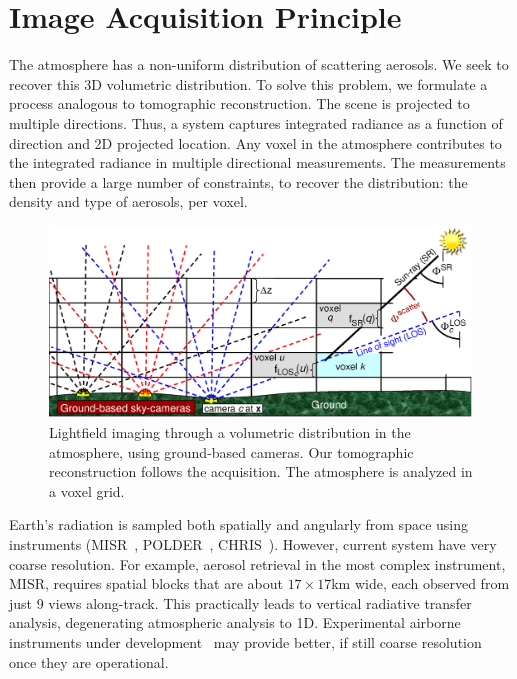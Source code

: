 \documentclass[10pt,twocolumn,letterpaper]{article}
\begin{document}
\section{Image Acquisition Principle}
\label{sec:setup} \vspace{-0.2cm}

The atmosphere has a non-uniform distribution of scattering aerosols. We seek to recover this 3D volumetric distribution. To solve this problem, we formulate a process analogous to tomographic reconstruction. The scene is projected to multiple directions. Thus, a system captures integrated radiance as a function of direction and 2D projected location. Any voxel in the atmosphere contributes to the integrated radiance in multiple directional measurements. The measurements then provide a large number of constraints, to recover the distribution: the density and type of aerosols, per voxel.
\begin{figure}[t!]
   \begin{center}
\vspace{-0.4cm}
    \includegraphics[width=0.99\linewidth]{groundtomog24.eps}
    \end{center}\vspace{-1.5cm}
    \caption{\small
    Lightfield imaging through a volumetric distribution in
    the atmosphere, using ground-based cameras. Our tomographic reconstruction
    follows the acquisition. The atmosphere is analyzed in a voxel grid.}
   \label{fig:groundgrid}
\end{figure}

Earth's radiation is sampled both spatially and angularly from space using instruments (MISR~\cite{diner,matronchik}, POLDER~\cite{breon}, CHRIS~\cite{vanMol}). However, current system have very coarse resolution. For example, aerosol retrieval in the most complex instrument, MISR, requires spatial blocks that are about $17\times 17$km wide, each observed from just 9 views along-track. This practically leads to vertical radiative transfer analysis, degenerating atmospheric analysis to 1D. Experimental airborne instruments under development~\cite{baxter,dinerDavis10} may provide better, if still coarse resolution once they are operational.
\end{document}
